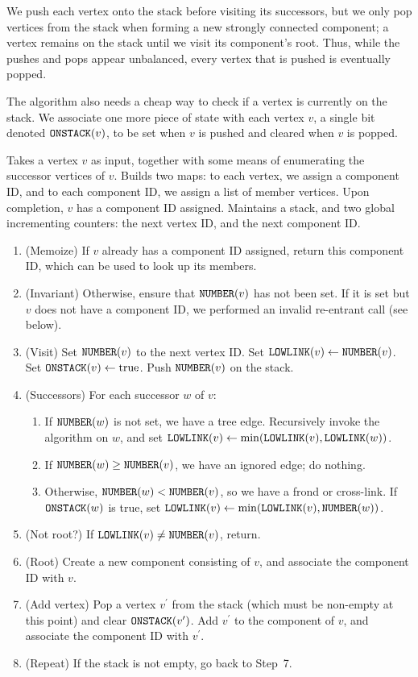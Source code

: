 \documentclass[../generics]{subfiles}
\begin{document}
We push each vertex onto the stack before visiting its successors, but we only pop vertices from the stack when forming a new strongly connected component; a vertex remains on the stack until we visit its component's root. Thus, while the pushes and pops appear unbalanced, every vertex that is pushed is eventually popped.

The algorithm also needs a cheap way to check if a vertex is currently on the stack. We associate one more piece of state with each vertex $v$, a single bit denoted $\texttt{ONSTACK}(v)$, to be set when $v$ is pushed and cleared when $v$ is popped.

\begin{algorithm}\label{tarjan}
Takes a vertex $v$ as input, together with some means of enumerating the successor vertices of $v$. Builds two maps: to each vertex, we assign a component ID, and to each component ID, we assign a list of member vertices. Upon completion, $v$ has a component ID assigned. Maintains a stack, and two global incrementing counters: the next vertex ID, and the next component ID.
\begin{enumerate}
\item (Memoize) If $v$ already has a component ID assigned, return this component ID, which can be used to look up its members.
\item (Invariant) Otherwise, ensure that $\texttt{NUMBER}(v)$ has not been set. If it is set but $v$ does not have a component ID, we performed an invalid re-entrant call (see below).
\item (Visit) Set $\texttt{NUMBER}(v)$ to the next vertex ID. Set $\texttt{LOWLINK}(v)\leftarrow\texttt{NUMBER}(v)$. Set $\texttt{ONSTACK}(v)\leftarrow \textrm{true}$. Push $\texttt{NUMBER}(v)$ on the stack.
\item (Successors) For each successor $w$ of $v$:
\begin{enumerate}
\item If $\texttt{NUMBER}(w)$ is not set, we have a tree edge. Recursively invoke the algorithm on $w$, and set $\texttt{LOWLINK}(v)\leftarrow\min(\texttt{LOWLINK}(v), \texttt{LOWLINK}(w))$.
\item If $\texttt{NUMBER}(w)\geq\texttt{NUMBER}(v)$, we have an ignored edge; do nothing.
\item Otherwise, $\texttt{NUMBER}(w)<\texttt{NUMBER}(v)$, so we have a frond or cross-link. If $\texttt{ONSTACK}(w)$ is true, set $\texttt{LOWLINK}(v)\leftarrow\min(\texttt{LOWLINK}(v),\texttt{NUMBER}(w))$.
\end{enumerate}
\item (Not root?) If $\texttt{LOWLINK}(v)\neq\texttt{NUMBER}(v)$, return.
\item (Root) Create a new component consisting of $v$, and associate the component ID with $v$.
\item (Add vertex) Pop a vertex $v^\prime$ from the stack (which must be non-empty at this point) and clear $\texttt{ONSTACK}(v^\prime)$. Add $v^\prime$ to the component of $v$, and associate the component ID with $v^\prime$.
\item (Repeat) If the stack is not empty, go back to Step~7.
\end{enumerate}
\end{algorithm}
\end{document}
